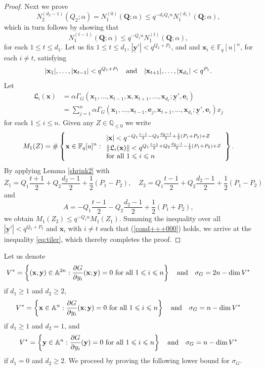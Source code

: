 \documentclass[12pt, reqno]{amsart}
\numberwithin{equation}{section}
\newcommand{\0}{\mathbf{0}}
\renewcommand{\AA}{\mathbb{A}}
\newcommand{\FF}{\mathbb{F}}
\newcommand{\QQ}{\mathbb{Q}}
\renewcommand{\leq}{\leqslant}
\renewcommand{\geq}{\geqslant}
\newcommand{\x}{\mathbf{x}}
\newcommand{\y}{\mathbf{y}}
\renewcommand{\=}{\equiv}
\newcommand{\1}{\mathbf{1}}
\theoremstyle{definition}
\begin{document}
\begin{proof}
Next we prove
$$
N_2^{(d_2-1)}(Q_2; \alpha) = N_1^{(0)}(\mathbf Q ; \alpha) \leq q^{ - d_1 Q_1 n  } N_1^{(d_1)}(
\mathbf 
Q; \alpha),
$$
which in turn follows by showing that
\begin{equation}\label{eq:tiler}
N_1^{(t-1)}(\mathbf  Q; \alpha) \leq  q^{- Q_1 n}  N_1^{(t)}(\mathbf Q; \alpha),
\end{equation}
for each $1 \leq t \leq d_1$.
Let us fix $1 \leq t \leq d_1$, $|\underline{\mathbf{y}}'| < q^{Q_2 + P_2}$, and 
and $\x_i \in \FF_q[u]^n$, for each $i \neq t$, satisfying
\begin{equation}
\label{cond+++000}
|\x_1|,\ldots, |\x_{t-1}| < q^{Q_1 + P_1}
\quad
\textnormal{and}
\quad
|\x_{t + 1}|,\ldots, |\x_{d_1}|  < q^{P_1}.
\end{equation}
Let
\begin{align*}
\mathfrak{L}_{i} (\x)
&=
\alpha  \Gamma_G (  \x_{1}, \ldots, \x_{t-1}, \x , \x_{t + 1},  \ldots, \x_{d_1}; \underline{\mathbf{y}}',   \mathbf{e}_{i})
\\
&= \sum_{j=1}^n  \alpha  \Gamma_G (  \x_{1}, \ldots, \x_{t-1}, \mathbf{e}_j , \x_{t + 1}, \ldots, \x_{d_1}; \underline{\mathbf{y}}',   \mathbf{e}_{i}) x_j
\end{align*}
for each $1 \leq i \leq n$.
Given any $Z \in \QQ_{\leq 0}$ we write
$$
M_1(Z)
=
\#
\left\{
 \x \in  \FF_q[u]^n:
\begin{array}{l}
   |\x| < q^{ - Q_1  \frac{t - 1 }{2}   - Q_2 \frac{d_2-1}{2} + \frac12 (P_1 + P_2) + Z    }    \\
   \|\mathfrak{L}_{i}(\x) \|  < q^{  Q_1  \frac{t - 1 }{2}   + Q_2 \frac{d_2-1}{2} - \frac12 (P_1 + P_2) + Z    }   \\
 \textnormal{for all $1 \leq i \leq n$}
\end{array}
\right\}.
$$
By applying Lemma \ref{shrink2} with
$$
Z_1 = Q_1  \frac{t + 1 }{2} +  Q_2 \frac{d_2-1}{2}  + \frac12 (P_1 - P_2), \quad
Z_2 = Q_1 \frac{t - 1 }{2} + Q_2 \frac{d_2-1}{2} + \frac12 (P_1 - P_2)
$$
and
$$
A = - Q_1  \frac{t - 1 }{2} -  Q_2 \frac{d_2-1}{2} + \frac12 (P_1 + P_2),
$$
we obtain
$
M_1( Z_2 )   \leq q^{- Q_1 n }  M_1( Z_1 ).
$
Summing the inequality over all
$|\underline{\mathbf{y}}'| < q^{ Q_2 + P_2 }$ and
$\x_{i}$ with $i \neq t$ such that (\ref{cond+++000}) holds,
we arrive at the inequality \eqref{eq:tiler}, which thereby completes the proof.
\end{proof}

Let us denote
$$
V^* = \left\{  (\x, \y) \in \AA^{2n}:  \frac{\partial G}{ \partial y_i } (\x; \y) = 0 \textnormal{ for all $1 \leq i \leq n$} \right\}
\quad
\textnormal{and}
\quad
\sigma_G = 2n - \dim V^*
$$
if $d_1 \geq 1$ and $d_2 \geq 2$,
$$
V^* = \left\{  \x  \in \AA^{n}:  \frac{\partial G}{ \partial y_i } (\x; \y) = 0 \textnormal{ for all $1 \leq i \leq n$} \right\}
\quad
\textnormal{and}
\quad
\sigma_G = n - \dim V^*
$$
if $d_1 \geq 1$ and $d_2 = 1$, and
$$
V^* = \left\{  \y  \in \AA^{n}:  \frac{\partial G}{ \partial y_i } (\y) = 0 \textnormal{ for all $1 \leq i \leq n$} \right\}
\quad
\textnormal{and}
\quad
\sigma_G = n - \dim V^*
$$
if $d_1 = 0$ and $d_2 \geq 2$.
We proceed by proving the following lower bound for $\sigma_G$.
\end{document}
